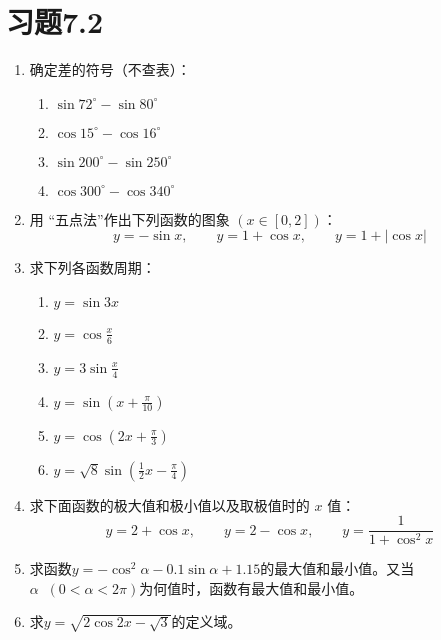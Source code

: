 \section*{习题7.2}
\begin{enumerate}
    \item 确定差的符号（不查表）：
 \begin{multicols}{2}
\begin{enumerate}
    \item     $\sin 72^{\circ}-\sin 80^{\circ}$
    \item  $\cos 15^{\circ}-\cos 16^{\circ}$
    \item  $\sin 200^{\circ}-\sin 250^{\circ}$
    \item  $\cos 300^{\circ}-\cos 340^{\circ}$
\end{enumerate}
 \end{multicols}

 \item 用 “五点法”作出下列函数的图象 $(x \in [0,2])$：
$$y=-\sin x,     \qquad y=1+\cos x,\qquad  y=1+|\cos x|$$


\item 求下列各函数周期：
\begin{multicols}{2}
\begin{enumerate}
    \item $y=\sin 3 x$
    \item $y=\cos \frac{x}{6}$
    \item $y=3 \sin \frac{x}{4}$
    \item $y=\sin \left(x+\frac{\pi}{10}\right)$
    \item $y=\cos \left(2 x+\frac{\pi}{3}\right)$
    \item $y=\sqrt{8} \sin \left(\frac{1}{2} x-\frac{\pi}{4}\right) $
\end{enumerate}
\end{multicols}

    
    \item 求下面函数的极大值和极小值以及取极值时的 $x$ 值：
    $$ y=2+\cos x, \qquad y=2-\cos x,\qquad y=\frac{1}{1+\cos^2 x}$$

\item 求函数$y=-\cos^2\alpha -0.1\sin\alpha+1.15$的最大值和最小值。又当
$\alpha\;\; (0<\alpha<2\pi)$为何值时，函数有最大值和最小值。

\item 求$y=\sqrt{2\cos 2x-\sqrt{3}}$的定义域。

\end{enumerate}

